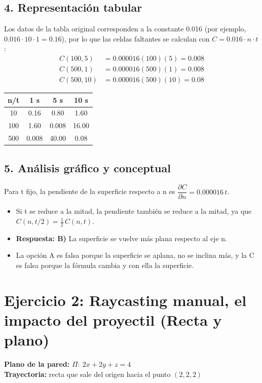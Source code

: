 \documentclass[50pt]{article}
\begin{document}
\subsection*{4. Representaci\'on tabular}
Los datos de la tabla original corresponden a la constante 0.016 (por ejemplo, $0.016 \cdot 10 \cdot 1 = 0.16$), por lo que las celdas faltantes se calculan con $C = 0.016 \cdot n \cdot t$:
\begin{align*}
C(100,5) &= 0.000016(100)(5) = 0.008\\
C(500,1) &= 0.000016(500)(1) = 0.008\\
C(500,10) &= 0.000016(500)(10) = 0.08
\end{align*}
\begin{center}
\begin{tabular}{|c|c|c|c|}
\hline
\textbf{n/t} & \textbf{1 s} & \textbf{5 s} & \textbf{10 s} \\ \hline
10 & 0.16 & 0.80 & 1.60 \\ \hline
100 & 1.60 & 0.008 & 16.00 \\ \hline
500 & 0.008 & 40.00 & 0.08 \\ \hline
\end{tabular}
\end{center}
\subsection*{5. Análisis gráfico y conceptual}
Para t fijo, la pendiente de la superficie respecto a n es $\dfrac{\partial C}{\partial n} = 0.000016\,t$.
\begin{itemize}[leftmargin=1.5em]
\item Si t se reduce a la mitad, la pendiente también se reduce a la mitad, ya que $C(n,t/2) = \tfrac{1}{2}\,C(n,t)$.
\item \textbf{Respuesta: B)} La superficie se vuelve más plana respecto al eje n.
\item La opción A es falsa porque la superficie se aplana, no se inclina más, y la C es falsa porque la fórmula cambia y con ella la superficie.
\end{itemize}
\newpage

 
\section*{Ejercicio 2: Raycasting manual, el impacto del proyectil (Recta y plano)}
\noindent\textbf{Plano de la pared:} $\Pi:\ 2x + 2y + z = 4$\\
\noindent\textbf{Trayectoria:} recta que sale del origen hacia el punto $(2,2,2)$\\
 
\end{document}

